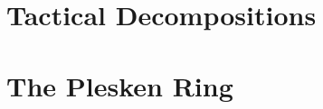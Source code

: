 

\bigskip


\clearpage



\section{Tactical Decompositions}
\label{sec:tactical:decompositions}








\bigskip
\clearpage


\section{The Plesken Ring}
\label{sec:plesken:ring}








\bigskip
\clearpage

